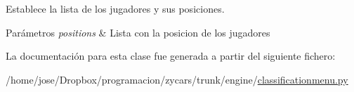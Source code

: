 \-Establece la lista de los jugadores y sus posiciones. 


\begin{DoxyParams}{\-Parámetros}
{\em positions} & \-Lista con la posicion de los jugadores \\
\hline
\end{DoxyParams}


\-La documentación para esta clase fue generada a partir del siguiente fichero\-:\begin{DoxyCompactItemize}
\item 
/home/jose/\-Dropbox/programacion/zycars/trunk/engine/\hyperlink{classificationmenu_8py}{classificationmenu.\-py}\end{DoxyCompactItemize}
